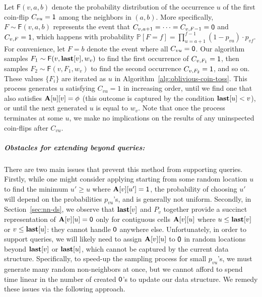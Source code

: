 Let $\mathsf{F}(v,a,b)$ denote the probability distribution of the occurrence $u$ of the first coin-flip $C_{vu} = \mathsf{1}$ among the neighbors in $(a, b)$.
More specifically, $F\sim\mathsf{F}(v,a,b)$ represents the event that $C_{v,a+1}=\cdots=C_{v,F-1}=\mathsf{0}$ and $C_{v,F}=\mathsf{1}$,
which happens with probability $\mathbb P[F=f]=\prod_{u=a+1}^{f-1} (1-p_{vu}) \cdot p_{vf}$.
For convenience, let $F = b$ denote the event where all $C_{vu}=\mathsf{0}$. Our algorithm samples $F_1\sim\mathsf{F}(v,\mathbf{last}[v],w_v)$ to find the first occurrence of $C_{v,F_1} = \mathsf{1}$, then samples $F_2\sim\mathsf{F}(v,F_1,w_v)$ to find the second occurrence $C_{v,F_2} = \mathsf{1}$, and so on.
These values $\{F_i\}$ are iterated as $u$ in Algorithm~\ref{alg:oblivious-coin-toss}.
This process generates $u$ satisfying $C_{vu}=1$ in increasing order,
until we find one that also satisfies $\mathbf{A}[u][v]=\phi$ (this outcome is captured by the condition $\mathbf{last}[u] < v$),
or until the next generated $u$ is equal to $w_v$.
Note that once the process terminates at some $u$, we make no implications on the results of any uninspected coin-flips after $C_{vu}$.

\subparagraph*{Obstacles for extending beyond  queries:}
There are two main issues that prevent this method from supporting  queries.
Firstly, while one might consider applying  starting from some random location $u$ to find the minimum $u' \geq u$
where $\mathbf{A}[v][u']=\mathsf{1}$, the probability of choosing $u'$ will depend on the probabilities $p_{vu}$'s, and is generally not uniform.
Secondly, in Section~\ref{sec:nn-ds}, we observe that $\mathbf{last}[v]$ and $P_v$ together provide a succinct representation of $\mathbf{A}[v][u] = \mathsf{0}$
only for contiguous cells $\mathbf{A}[v][u]$ where $u \leq \mathbf{last}[v]$ or $v \leq \mathbf{last}[u]$: they cannot handle $\mathsf{0}$ anywhere else.
Unfortunately, in order to support  queries, we will likely need to assign $\mathbf{A}[v][u]$ to $\mathsf{0}$ in random locations
beyond $\mathbf{last}[v]$ or $\mathbf{last}[u]$, which cannot be captured by the current data structure.
Specifically, to speed-up the sampling process for small $p_{vu}$'s, we must generate many random non-neighbors at once,
but we cannot afford to spend time linear in the number of created $\mathsf{0}$'s to update our data structure.
We remedy these issues via the following approach.
